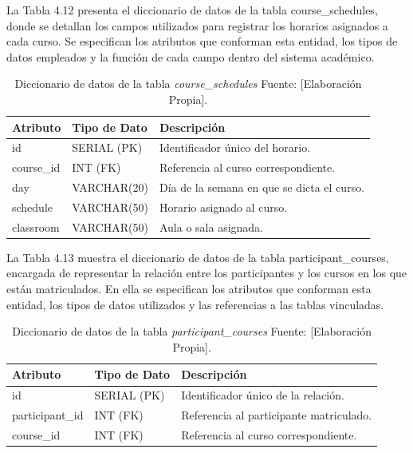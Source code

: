 La Tabla 4.12 presenta el diccionario de datos de la tabla course\_schedules, donde se detallan los campos utilizados para registrar los horarios asignados a cada curso. Se especifican los atributos que conforman esta entidad, los tipos de datos empleados y la función de cada campo dentro del sistema académico.
\begin{table}[H]
\centering
\caption{Diccionario de datos de la tabla \textit{course\_schedules} Fuente: [Elaboración Propia].}
\begin{tabular}{|l|l|p{7.7cm}|}
\hline
\textbf{Atributo} & \textbf{Tipo de Dato} & \textbf{Descripción} \\ \hline
id & SERIAL (PK) & Identificador único del horario. \\ \hline
course\_id & INT (FK) & Referencia al curso correspondiente. \\ \hline
day & VARCHAR(20) & Día de la semana en que se dicta el curso. \\ \hline
schedule & VARCHAR(50) & Horario asignado al curso. \\ \hline
classroom & VARCHAR(50) & Aula o sala asignada. \\ \hline
\end{tabular}
\end{table}


La Tabla 4.13 muestra el diccionario de datos de la tabla participant\_courses, encargada de representar la relación entre los participantes y los cursos en los que están matriculados. En ella se especifican los atributos que conforman esta entidad, los tipos de datos utilizados y las referencias a las tablas vinculadas.
\begin{table}[H]
\centering
\caption{Diccionario de datos de la tabla \textit{participant\_courses} Fuente: [Elaboración Propia].}
\begin{tabular}{|l|l|p{7.1cm}|}
\hline
\textbf{Atributo} & \textbf{Tipo de Dato} & \textbf{Descripción} \\ \hline
id & SERIAL (PK) & Identificador único de la relación. \\ \hline
participant\_id & INT (FK) & Referencia al participante matriculado. \\ \hline
course\_id & INT (FK) & Referencia al curso correspondiente. \\ \hline
\end{tabular}
\end{table}



